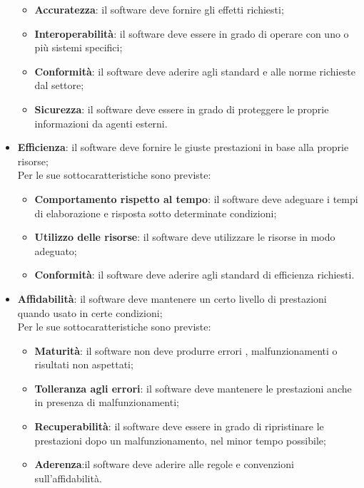 \documentclass[../piano-di-qualifica.tex]{subfiles}
\begin{document}
\begin{itemize}
\begin{itemize}
            \item \textbf{Accuratezza}: il software deve fornire gli effetti richiesti;
            \item \textbf{Interoperabilità}: il software deve essere in grado di operare con uno o più sistemi specifici;
            \item \textbf{Conformità}: il software deve aderire agli standard e alle norme richieste dal settore;
            \item \textbf{Sicurezza}: il software deve essere in grado di proteggere le proprie informazioni da agenti esterni.
        \end{itemize}
        \item \textbf{Efficienza}: il software deve fornire le giuste prestazioni in base alla proprie risorse;
        \\Per le sue sottocaratteristiche sono previste:
        \begin{itemize}
            \item \textbf{Comportamento rispetto al tempo}: il software deve adeguare i tempi di elaborazione e risposta sotto determinate condizioni;
            \item \textbf{Utilizzo delle risorse}: il software deve utilizzare le risorse in modo adeguato;
            \item \textbf{Conformità}: il software deve aderire agli standard di efficienza richiesti.
        \end{itemize}
        \item \textbf{Affidabilità}: il software deve mantenere un certo livello di prestazioni quando usato in certe condizioni;
        \\Per le sue sottocaratteristiche sono previste:
        \begin{itemize}
            \item \textbf{Maturità}: il software non deve produrre errori , malfunzionamenti o risultati non aspettati;
            \item \textbf{Tolleranza agli errori}: il software deve mantenere le prestazioni anche in presenza di malfunzionamenti;
            \item \textbf{Recuperabilità}: il software deve essere in grado di ripristinare le prestazioni dopo un malfunzionamento, nel minor tempo possibile;
            \item \textbf{Aderenza}:il software deve aderire alle regole e convenzioni sull'affidabilità.
        \end{itemize}

\end{itemize}
\end{document}
